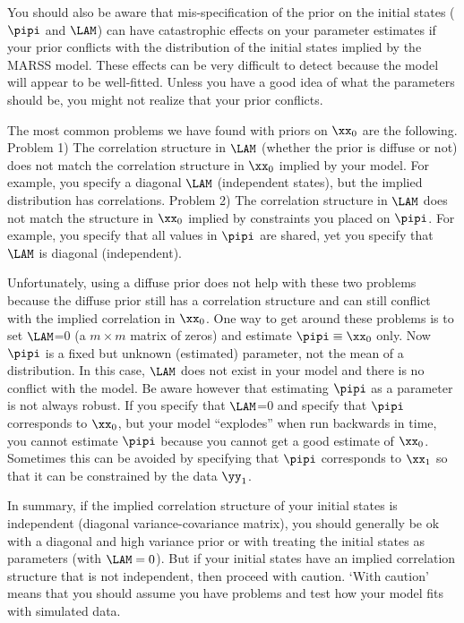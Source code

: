 You should also be aware that mis-specification of the prior on the initial states ($\pipi$ and $\LAM$) can have catastrophic effects on your parameter estimates if your prior conflicts with the distribution of the initial states implied by the MARSS model.  These effects can be very difficult to detect because the model will appear to be well-fitted.  Unless you have a good idea of what the parameters should be, you might not realize that your prior conflicts.  

The most common problems we have found with priors on $\xx_0$ are the following.  Problem 1) The correlation structure in $\LAM$ (whether the prior is diffuse or not) does not match the correlation structure in $\xx_0$ implied by your model.  For example, you specify a diagonal $\LAM$ (independent states), but the implied distribution has correlations. Problem 2) The correlation structure in $\LAM$ does not match the structure in $\xx_0$ implied by constraints you placed on $\pipi$.  For example, you specify that all values in $\pipi$ are shared, yet you specify that $\LAM$ is diagonal (independent).  

Unfortunately, using a diffuse prior does not help with these two problems because  the diffuse prior still has a correlation structure and can still conflict with the implied correlation in $\xx_0$.  One way to get around these problems is to set $\LAM$=0 (a $m \times m$ matrix of zeros) and estimate $\pipi \equiv \xx_0$ only.  Now $\pipi$ is a fixed but unknown (estimated) parameter, not the mean of a distribution.  In this case, $\LAM$ does not exist in your model and there is no conflict with the model.  
Be aware however that estimating $\pipi$ as a parameter is not always robust. If you specify that $\LAM$=0 and specify that $\pipi$ corresponds to $\xx_0$, but your model ``explodes'' when run backwards in time, you cannot estimate $\pipi$ because you cannot get a good estimate of $\xx_0$.  Sometimes this can be avoided by specifying that $\pipi$ corresponds to $\xx_1$ so that it can be constrained by the data $\yy_1$. 

In summary, if the implied correlation structure of your initial states is independent (diagonal variance-covariance matrix), you should generally be ok with a diagonal and high variance prior or with treating the initial states as parameters (with $\LAM=0$).  But if your initial states have an implied correlation structure that is not independent, then proceed with caution. `With caution' means that you should assume you have problems and test how your model fits with simulated data.


